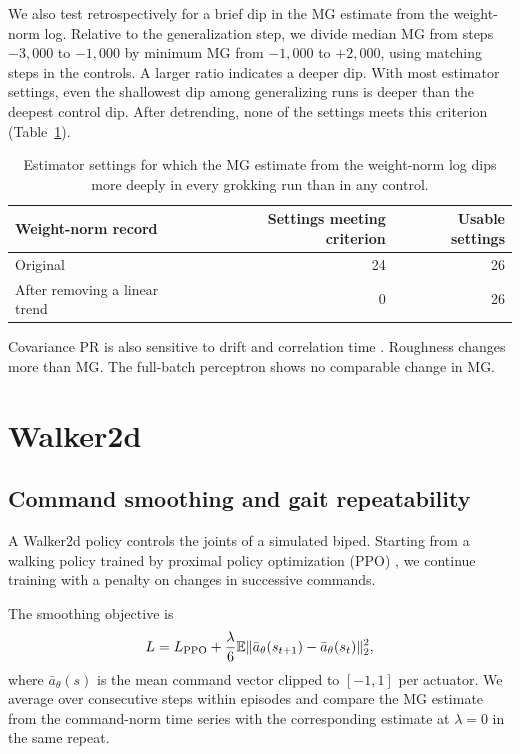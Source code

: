 {We also test retrospectively for a brief dip in the MG estimate from the weight-norm log. Relative to the generalization step, we divide median MG from steps $-3{,}000$ to $-1{,}000$ by minimum MG from $-1{,}000$ to $+2{,}000$, using matching steps in the controls. A larger ratio indicates a deeper dip. With most estimator settings, even the shallowest dip among generalizing runs is deeper than the deepest control dip. After detrending, none of the settings meets this criterion (Table~\ref{tab:grokking-drop}).

\begin{table}[H]
\centering\small
\caption{Estimator settings for which the MG estimate from the weight-norm log dips more deeply in every grokking run than in any control.}
\label{tab:grokking-drop}
\begin{tabular}{lrr}
\toprule
Weight-norm record & Settings meeting criterion & Usable settings \\
\midrule
Original & 24 & 26 \\
After removing a linear trend & 0 & 26 \\
\bottomrule
\end{tabular}
\end{table}

Covariance PR is also sensitive to drift and correlation time \citep{antognini2018pca}. Roughness changes more than MG. The full-batch perceptron shows no comparable change in MG.

\FloatBarrier
\section[Walker2d]{Walker2d}\label{app:walker2d}
\subsection[Command smoothing and gait repeatability]{Command smoothing and gait repeatability}
A Walker2d policy controls the joints of a simulated biped. Starting from a walking policy trained by proximal policy optimization (PPO) \citep{schulman2017proximal,todorov2012mujoco}, we continue training with a penalty on changes in successive commands.

The smoothing objective is
\[
L=L_{\rm PPO}+\frac{\lambda}{6}\mathbb E\|\bar a_\theta(s_{t+1})-\bar a_\theta(s_t)\|_2^2,
\]
where $\bar a_\theta(s)$ is the mean command vector clipped to $[-1,1]$ per actuator. We average over consecutive steps within episodes and compare the MG estimate from the command-norm time series with the corresponding estimate at $\lambda=0$ in the same repeat.

}
